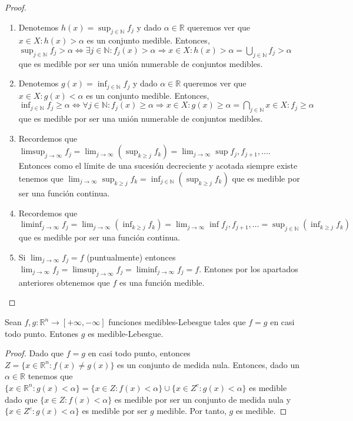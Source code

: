 \begin{proof}
    \begin{enumerate}
        \item Denotemos $h(x) = \sup_{j \in \mathbb{N}}{f_j}$ y dado $\alpha \in \mathbb{R}$ queremos ver que ${x \in X : h(x) > \alpha}$ es un conjunto medible. Entonces, $\sup_{j \in \mathbb{N}}{f_j > \alpha} \iff \exists j \in \mathbb{N} : f_j(x) > \alpha \Rightarrow {x \in X : h(x) > \alpha} = \bigcup_{j \in \mathbb{N}}{f_j > \alpha}$ que es medible por ser una unión numerable de conjuntos medibles.
        \item Denotemos $g(x) = \inf_{j \in \mathbb{N}}{f_j}$ y dado $\alpha \in \mathbb{R}$ queremos ver que ${x \in X : g(x) < \alpha}$ es un conjunto medible. Entonces, $\inf_{j \in \mathbb{N}}{f_j \geq \alpha} \iff \forall j \in \mathbb{N} : f_j(x) \geq \alpha \Rightarrow {x \in X : g(x) \geq \alpha} = \bigcap_{j \in \mathbb{N}}{x \in X : f_j \geq \alpha}$ que es medible por ser una unión numerable de conjuntos medibles.
        \item Recordemos que $\limsup_{j \to \infty}f_j = \lim_{j \to \infty}(\sup_{k \geq j}f_k) = \lim_{j \to \infty}{\sup{f_j, f_{j+1}, \dots}}$. Entonces como el límite de una sucesión decreciente y acotada siempre existe tenemos que $\lim_{j \to \infty}{\sup_{k \geq j}f_k} = \inf_{j \in \mathbb{N}}{(\sup_{k \geq j}f_k)}$ que es medible por ser una función continua.
        \item Recordemos que $\liminf_{j \to \infty}f_j = \lim_{j \to \infty}(\inf_{k \geq j}f_k) = \lim_{j \to \infty}{\inf{f_j, f_{j+1}, \dots}}  = \sup_{j \in \mathbb{N}}{(\inf_{k \geq j}f_k)}$ que es medible por ser una función continua.
        \item Si $\lim_{j \to \infty}f_j = f$ (puntualmente) entonces $\lim_{j \to \infty}f_j = \limsup_{j \to \infty}f_j = \liminf_{j \to \infty}f_j = f$. Entones por los apartados anteriores obtenemos que $f$ es una función medible. 
    \end{enumerate}
\end{proof}

\begin{proposición}
    Sean $f, g: \mathbb{R}^n \to [+\infty, -\infty]$ funciones medibles-Lebesgue tales que $f = g$ en casi todo punto. Entones $g$ es medible-Lebesgue.
\end{proposición}


\begin{proof}
    Dado que $f = g$ en casi todo punto, entonces $ Z = \{x \in \mathbb{R}^n : f(x) \neq g(x)\}$ es un conjunto de medida nula. Entonces, dado un $\alpha \in \mathbb{R}$ tenemos que $\{x \in \mathbb{R}^n : g(x) < \alpha\} = \{x \in Z : f(x) < \alpha\} \cup \{x \in Z^c : g(x) < \alpha\}$ es medible dado que $\{x \in Z : f(x) < \alpha\}$ es medible por ser un conjunto de medida nula y $\{x \in Z^c : g(x) < \alpha\}$ es medible por ser $g$ medible. Por tanto, $g$ es medible.
\end{proof}

